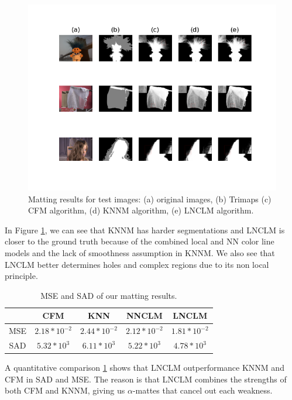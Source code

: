 \begin{figure}[htb]
	\centering
	\includegraphics[]{bilder/result_comparison}
	\caption{Matting results for test images: (a) original images, (b) Trimaps (c) CFM algorithm, (d) KNNM algorithm, (e) LNCLM algorithm.}\label{fig_6}
\end{figure}

In Figure \ref{fig_6}, we can see that KNNM has harder segmentations and LNCLM is closer to the ground truth because of the combined local and NN color line models and the lack of smoothness assumption in KNNM. We also see that LNCLM better determines holes and complex regions due to its non local principle\cite{lnclm}. 

\begin{table}
	\centering
	\begin{tabular}{ c c c c c }
		\hline
		& CFM & KNN	& NNCLM & LNCLM \\ 
		\hline
		MSE & $2.18 * 10^{-2}$ & $2.44 * 10^{-2}$ & $2.12 * 10^{-2}$ & $1.81 * 10^{-2}$ \\  
		\hline
		SAD & $5.32 * 10^{3}$ & $6.11 * 10^{3}$	& $5.22 * 10^{3}$ & $4.78 * 10^{3}$ \\  
		\hline
	\end{tabular}
	\caption{MSE and SAD of our matting results.} \label{table:1}
\end{table}

A quantitative comparison \ref{table:1} shows that LNCLM outperformance KNNM and CFM in SAD and MSE. The reason is that LNCLM combines the strengths of both CFM and KNNM, giving us $\alpha$-mattes that cancel out each weakness. 

